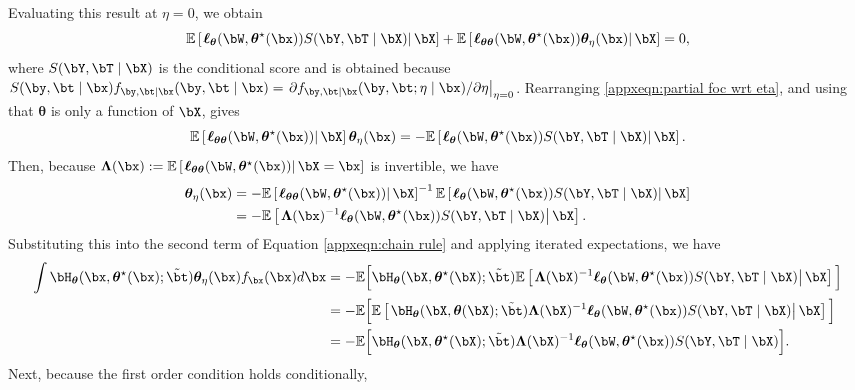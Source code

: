 \documentclass[12pt]{article}
\numberwithin{equation}{section}
\theoremstyle{definition}
\newcommand{\E}{\mathbb{E}}
\newcommand{\btheta}{\boldsymbol{\theta}}
\newcommand{\bL}{\boldsymbol{\Lambda}}
\newcommand{\bttrue}{\btheta^\star}
\newcommand{\btstar}{\tilde{\bt}}
\begin{document}
\begin{appendices}
Evaluating this result at $\eta=0$, we obtain
\begin{equation}
	\label{appxeqn:partial foc wrt eta}
	 \E \left[ \left.  \bm{\ell}_{\btheta}(\bW, \bttrue(\bx)) S(\bY,\bT \mid \bX) \right\vert \bX \right]    	+   \E \left[ \left. \bm{\ell}_{\btheta\btheta}(\bW, \bttrue(\bx)) \btheta_{\eta}(\bx) \right| \bX \right]  = 0,
\end{equation}
where $S(\bY,\bT \mid \bX)$ is the conditional score and is obtained because $S(\by,\bt \mid \bx) f_{\by,\bt | \bx}(\by, \bt \mid \bx) = \left. \partial f_{\by,\bt | \bx}(\by, \bt ; \eta \mid \bx) / \partial \eta \right\vert_{\eta=0}$. Rearranging \eqref{appxeqn:partial foc wrt eta}, and using that $\btheta$ is only a function of $\bX$, gives
\[
	\E \left[ \left. \bm{\ell}_{\btheta\btheta}(\bW, \bttrue(\bx)) \right| \bX \right]  \btheta_{\eta}(\bx) =  - \E \left[ \left.  \bm{\ell}_{\btheta}(\bW, \bttrue(\bx)) S(\bY,\bT \mid \bX) \right\vert \bX \right].
\]
Then, because $\bL(\bx) := \E \left[ \left. \bm{\ell}_{\btheta\btheta}(\bW, \bttrue(\bx)) \right| \bX = \bx \right]$ is invertible, we have
\begin{align*}
	\btheta_{\eta}(\bx) & =  - \E \left[ \left. \bm{\ell}_{\btheta\btheta}(\bW, \bttrue(\bx)) \right| \bX \right]^{-1} \E \left[ \left.  \bm{\ell}_{\btheta}(\bW, \bttrue(\bx)) S(\bY,\bT \mid \bX) \right\vert \bX \right]   		\\
	& = - \E \left[ \left. \bL(\bx)^{-1} \bm{\ell}_{\btheta}(\bW, \bttrue(\bx)) S(\bY,\bT \mid \bX) \right\vert \bX \right].
\end{align*}
Substituting this into the second term of Equation \eqref{appxeqn:chain rule} and applying iterated expectations, we have
\begin{align*}
	\int  \bH_{\btheta}(\bx, \bttrue(\bx); \btstar) \btheta_{\eta}(\bx) f_{\bx}(\bx ) d\bx  
	& = - \E\Big[  \bH_{\btheta}(\bX, \bttrue(\bX); \btstar) \E \left[ \left. \bL(\bX)^{-1} \bm{\ell}_{\btheta}(\bW, \bttrue(\bx)) S(\bY,\bT \mid \bX) \right\vert \bX \right] \Big]  		\\
	& = - \E\Big[ \E \left[ \left. \bH_{\btheta}(\bX, \btheta(\bX); \btstar) \bL(\bX)^{-1} \bm{\ell}_{\btheta}(\bW, \bttrue(\bx)) S(\bY,\bT \mid \bX) \right\vert \bX \right] \Big]  		\\
	& = - \E\Big[  \bH_{\btheta}(\bX, \bttrue(\bX); \btstar) \bL(\bX)^{-1} \bm{\ell}_{\btheta}(\bW, \bttrue(\bx)) S(\bY,\bT \mid \bX)  \Big].
\end{align*}
Next, because the first order condition holds conditionally,
\begin{multline*}

\end{multline*}
\end{appendices}
\end{document}
